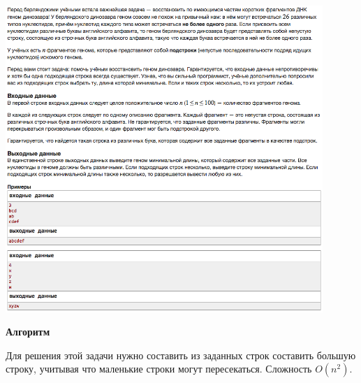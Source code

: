\documentclass[a4paper,12pt]{article}
\begin{document}
\begin{center}
\includegraphics[width=0.9\textwidth]{VK_Q2/B.png}\\ [1cm]
\end{center}

\textbf{{\large Алгоритм}}

Для решения этой задачи нужно составить из заданных строк составить большую строку, учитывая что маленькие строки могут пересекаться. Сложность $O(n^2)$.\\

\newpage
\end{document}
